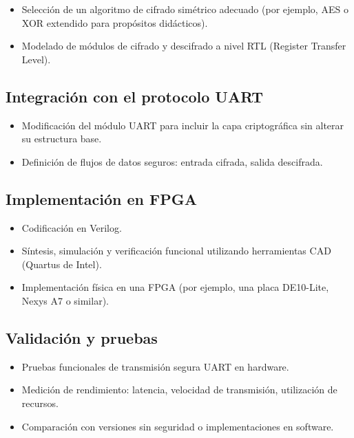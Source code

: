 \begin{itemize}
\item Selección de un algoritmo de cifrado simétrico adecuado (por ejemplo, AES o XOR extendido para propósitos didácticos).
\item Modelado de módulos de cifrado y descifrado a nivel RTL (Register Transfer Level).
\end{itemize}

\subsection{Integración con el protocolo UART }

\begin{itemize}
\item Modificación del módulo UART para incluir la capa criptográfica sin alterar su estructura base.
\item Definición de flujos de datos seguros: entrada cifrada, salida descifrada.
\end{itemize}

\subsection{Implementación en FPGA}

\begin{itemize}
\item Codificación en Verilog.
\item Síntesis, simulación y verificación funcional utilizando herramientas CAD (Quartus de Intel).
\item Implementación física en una FPGA (por ejemplo, una placa DE10-Lite, Nexys A7 o similar).
\end{itemize}

\subsection{ Validación y pruebas}

\begin{itemize}
\item Pruebas funcionales de transmisión segura UART en hardware.
\item Medición de rendimiento: latencia, velocidad de transmisión, utilización de recursos.
\item Comparación con versiones sin seguridad o implementaciones en software.
\end{itemize}

\subsection{ }





\endinput 